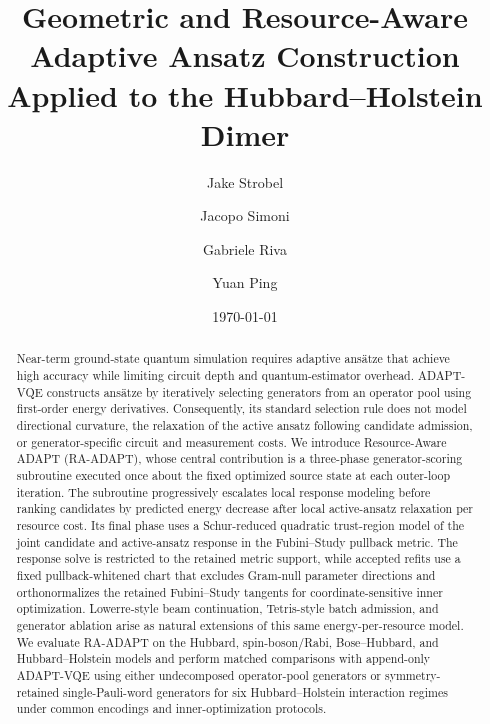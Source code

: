 \documentclass[
  reprint,
  amsmath,
  amssymb,
  aps,
  pra,
  nofootinbib,
  superscriptaddress,
  floatfix
]{revtex4-2}
\begin{document}
\makeatletter
\def\bibsection{\section*{\refname}\@nobreaktrue}
\makeatother

\title{Geometric and Resource-Aware Adaptive Ansatz Construction Applied to the Hubbard--Holstein Dimer}

\author{Jake Strobel}
\author{Jacopo Simoni}
\author{Gabriele Riva}
\author{Yuan Ping}

\date{\today}

\begin{abstract}
Near-term ground-state quantum simulation requires adaptive ansätze that
achieve high accuracy while limiting circuit depth and quantum-estimator
overhead. ADAPT-VQE constructs ansätze by iteratively selecting generators
from an operator pool using first-order energy derivatives. Consequently, its
standard selection rule does not model directional curvature, the relaxation
of the active ansatz following candidate admission, or generator-specific
circuit and measurement costs. We introduce Resource-Aware ADAPT (RA-ADAPT),
whose central contribution is a three-phase generator-scoring subroutine
executed once about the fixed optimized source state at each outer-loop
iteration. The subroutine progressively
escalates local response modeling before ranking candidates by predicted energy
decrease after local active-ansatz relaxation per resource cost. Its final phase uses a Schur-reduced quadratic
trust-region model of the joint candidate and active-ansatz response in the
Fubini--Study pullback metric. The response solve is restricted to the retained
metric support, while accepted refits use a fixed pullback-whitened chart that
excludes Gram-null parameter directions and orthonormalizes the retained
Fubini--Study tangents for coordinate-sensitive inner optimization.
Lowerre-style beam continuation, Tetris-style batch admission, and generator
ablation arise as natural extensions of this same energy-per-resource model.
We evaluate RA-ADAPT on the Hubbard, spin-boson/Rabi, Bose--Hubbard, and
Hubbard--Holstein models and perform matched comparisons with append-only
ADAPT-VQE using either undecomposed operator-pool generators or
symmetry-retained single-Pauli-word generators for six Hubbard--Holstein
interaction regimes under common encodings and inner-optimization protocols.

\end{abstract}
\end{document}
